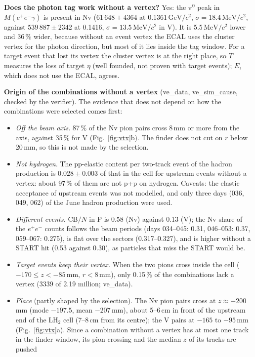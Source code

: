 \documentclass[11pt,a4paper]{article}
\newcommand{\piz}{\ensuremath{\pi^{0}}\xspace}
\newcommand{\ee}{\ensuremath{e^{+}e^{-}}\xspace}
\newcommand{\GeVcc}{\ensuremath{\mathrm{GeV}/c^{2}}\xspace}
\newcommand{\MeVcc}{\ensuremath{\mathrm{MeV}/c^{2}}\xspace}
\begin{document}
\textbf{Does the photon tag work without a vertex?} Yes: the \piz peak in $M(\ee\gamma)$ is present in Nv ($61\,648\pm4364$ at 0.1361\,\GeVcc,
$\sigma=18.4$\,\MeVcc, against $539\,887\pm2342$ at 0.1416, $\sigma=13.5$\,\MeVcc in V). It is 5.5\,\MeVcc lower and 36\,\% wider, because
without an event vertex the ECAL uses the cluster vertex for the photon direction, but most of it lies inside the tag window. For a target event
that lost its vertex the cluster vertex is at the right place, so $T$ measures the loss of target $\eta$ (well founded, not proven with target
events); $E$, which does not use the ECAL, agrees.

\textbf{Origin of the combinations without a vertex} (ve\_data, ve\_sim\_cause, checked by the verifier). The evidence that does not depend on how the
combinations were selected comes first:
\begin{itemize}\setlength{\itemsep}{0pt}
\item \emph{Off the beam axis.} 87\,\% of the Nv pion pairs cross 8\,mm or more from the axis, against 35\,\% for V (Fig.~\ref{fig:vtx}b). The
      finder does not cut on $r$ below 20\,mm, so this is not made by the selection.
\item \emph{Not hydrogen.} The pp-elastic content per two-track event of the hadron production is $0.028\pm0.003$ of that in the cell for
      upstream events without a vertex: about 97\,\% of them are not p+p on hydrogen. Caveats: the elastic acceptance of upstream events was not
      modelled, and only three days (036, 049, 062) of the June hadron production were used.
\item \emph{Different events.} CB$/N$ in P is 0.58 (Nv) against 0.13 (V); the Nv share of the \ee counts follows the beam periods (days 034--045:
      0.31, 046--053: 0.37, 059--067: 0.275), is flat over the sectors (0.317--0.327), and is higher without a START hit (0.53 against 0.30), as
      particles that miss the START would be.
\item \emph{Target events keep their vertex.} When the two pions cross inside the cell ($-170\le z<-85$\,mm, $r<8$\,mm), only 0.15\,\% of the combinations
      lack a vertex (3339 of 2.19 million; ve\_data).
\item \emph{Place} (partly shaped by the selection). The Nv pion pairs cross at $z\approx-200$\,mm (mode $-197.5$, mean $-207$\,mm), about
      5--6\,cm in front of the upstream end of the LH$_2$ cell (7--8\,cm from its centre); the V pairs at $-165$ to $-95$\,mm (Fig.~\ref{fig:vtx}a).
      Since a combination without a vertex has at most one track in the finder window, its pion crossing and the median $z$ of its tracks are pushed

\end{itemize}
\end{document}
